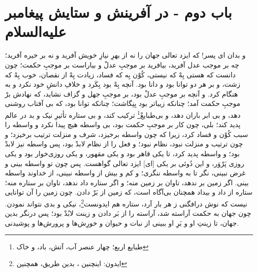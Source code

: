 \section*{باب دوم - در آفرینش و ستایش پیغامبر علیه‌السلام}



و بدان اى پسر! كه ايزد تعالى جهان را نه از بهرِ نيازِ خويش آفريد و نه بر خيره آفريد؛ چه بر موجب عدل آفريد، بيافريد بر موجبِ عدلْ و بياراست بر موجبِ حكمت؛ چون دانست كه هستى بِهْ كه نيستى، كُوْن بِه كه فساد، زيادت بِهْ از نقصان، خوب بِهْ كه زشت، و بر هر دو توانا بود و دانا بود. آنچه بِهْ بود بِكَرد و خلافِ دانشِ خود نكرد و به هنگام كرد. و آنچه بر موجبِ عدلْ بود، بر موجبِ جهل و گزاف نشايد، كه نهادش برْ موجبِ حكمت آمد؛ چنانكه زيباتر بود بِنِگاشت؛ چنانكه توانا بود، كه بى‌ آفتاب روشنى دهد، و بى‌ ابر باران دهد، و بى‌طبايعْ\footnote{ طبایع اربع؛ چهار عنصر آب، آتش، باد، و خاک} تركيب كند، و بى ‌ستاره تأثيرِ نيک و بد در عالم پديد كند؛ بلى، چون كار بر موجبِ حكمت بود، بى‌ واسطه هيچ پيدا نكرد و واسطه را سبب كُوْن و فساد كرد، زيرا كه چون واسطه برخيزد، شرف و منزلت ترتيب برخيزد؛ و چون ترتيب و منزلت نبود، نظام نبود؛ و فعل را از نظام لابدْ بود، پس واسطه نيز لابدْ بود؛ و واسطه پديد كرد، تا يكى قاهر بود و يكى مقهور، و يكى روزى‌خوار بود و يكى روزى پَرْوَر، و اين دُوئى بر يكى [اى] ايزد تعالى گواهست. پس چون تو واسطه بينى و غرض نبينى، نگر تا به واسطه ننگرى؛ و كم و بيش از واسطه نبينى، از خداوند واسطه بينى. اگر زمين بر ندهد، تاوان بر زمين منه؛ و اگر ستاره داد ندهد، تاوان بر ستاره منه؛ ستاره از داد و بیداد همچنان بى‌آگاه است، كه زمين از بَرْ دادن. چون زمين را آن توانايى نيست كه نوش درافگنى ز هر بار آرد، ستاره هم ايدونست\footnote{ایدون: اینچنین ، بدین طریق، همچنین}، نيكى و بدى نتواند نمودن. چون جهان به حكمت آراسته شد، آراسته را از بَر دادن و زينت لابُدْ بود؛ پس درنگر بدين جهان، تا زينتِ او و بَرِ او ببينى از نبات و حيوان و خورِش‌ها و پرورش‌ها و پوشيدنى.


